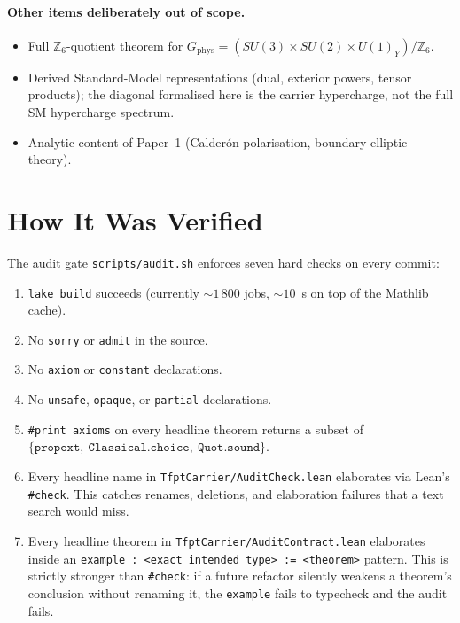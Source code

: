 \documentclass[11pt,a4paper]{article}
\begin{document}
\paragraph{Other items deliberately out of scope.}
\begin{itemize}[leftmargin=1.6em, itemsep=0pt]
\item Full $\mathbb Z_6$-quotient theorem for
    $G_{\mathrm{phys}} = (SU(3)\times SU(2)\times U(1)_Y)/\mathbb Z_6$.
\item Derived Standard-Model representations (dual, exterior
    powers, tensor products); the diagonal formalised here is
    the carrier hypercharge, not the full SM hypercharge
    spectrum.
\item Analytic content of Paper~1 (Calder\'on polarisation,
    boundary elliptic theory).
\end{itemize}

\section{How It Was Verified}

The audit gate \texttt{scripts/audit.sh} enforces seven hard
checks on every commit:

\begin{enumerate}[leftmargin=1.6em, itemsep=0pt]
\item \texttt{lake build} succeeds (currently $\sim 1\,800$ jobs,
      $\sim 10$~s on top of the Mathlib cache).
\item No \texttt{sorry} or \texttt{admit} in the source.
\item No \texttt{axiom} or \texttt{constant} declarations.
\item No \texttt{unsafe}, \texttt{opaque}, or \texttt{partial}
      declarations.
\item \texttt{\#print axioms} on every headline theorem returns a
      subset of $\{\texttt{propext},\ \texttt{Classical.choice},\
      \texttt{Quot.sound}\}$.
\item Every headline name in
      \texttt{TfptCarrier/AuditCheck.lean} elaborates via
      Lean's \texttt{\#check}. This catches renames, deletions,
      and elaboration failures that a text search would miss.
\item Every headline theorem in
      \texttt{TfptCarrier/AuditContract.lean} elaborates inside
      an
      \texttt{example : <exact intended type> := <theorem>}
      pattern. This is strictly stronger than \texttt{\#check}:
      if a future refactor silently weakens a theorem's
      conclusion without renaming it, the
      \texttt{example} fails to typecheck and the audit fails.
\end{enumerate}
\end{document}

